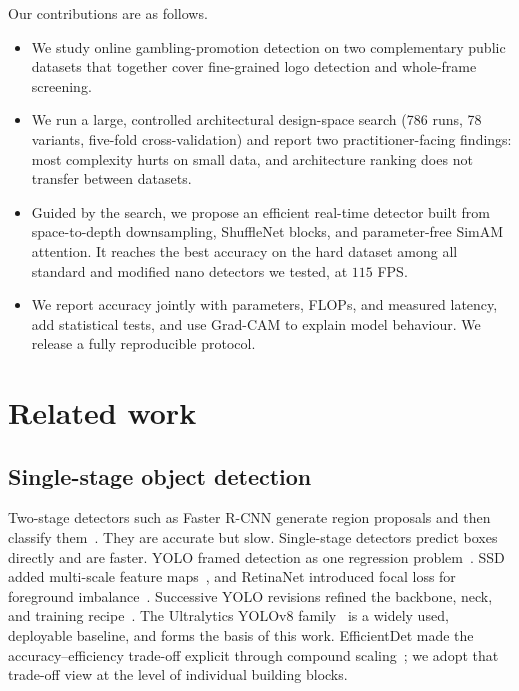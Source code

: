 \documentclass[preprint,review,12pt]{elsarticle}
\begin{document}
Our contributions are as follows.
\begin{itemize}
\item We study online gambling-promotion detection on two complementary public
datasets that together cover fine-grained logo detection and whole-frame
screening.
\item We run a large, controlled architectural design-space search (786 runs,
78 variants, five-fold cross-validation) and report two practitioner-facing
findings: most complexity hurts on small data, and architecture ranking does not
transfer between datasets.
\item Guided by the search, we propose an efficient real-time detector built from
space-to-depth downsampling, ShuffleNet blocks, and parameter-free SimAM
attention. It reaches the best accuracy on the hard dataset among all standard
and modified nano detectors we tested, at $115$ FPS.
\item We report accuracy jointly with parameters, FLOPs, and measured latency,
add statistical tests, and use Grad-CAM to explain model behaviour. We release a
fully reproducible protocol.
\end{itemize}

\section{Related work}

\subsection{Single-stage object detection}
Two-stage detectors such as Faster R-CNN generate region proposals and then
classify them~\cite{ren2015faster}. They are accurate but slow. Single-stage
detectors predict boxes directly and are faster. YOLO framed detection as one
regression problem~\cite{redmon2016you}. SSD added multi-scale feature
maps~\cite{liu2016ssd}, and RetinaNet introduced focal loss for foreground
imbalance~\cite{lin2017focal}. Successive YOLO revisions refined the backbone,
neck, and training recipe~\cite{redmon2018yolov3, bochkovskiy2020yolov4}. The
Ultralytics YOLOv8 family~\cite{jocher2023yolov8} is a widely used, deployable
baseline, and forms the basis of this work. EfficientDet made the
accuracy--efficiency trade-off explicit through compound
scaling~\cite{tan2020efficientdet}; we adopt that trade-off view at the level of
individual building blocks.
\end{document}
